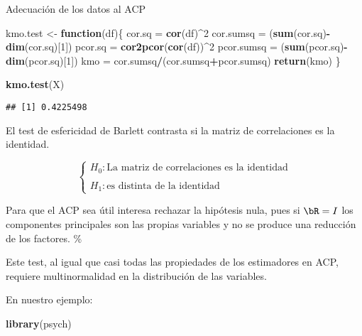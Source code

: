 \documentclass[
  spanish,
  ignorenonframetext,
]{beamer}
\newenvironment{Shaded}{\begin{snugshade}}{\end{snugshade}}
\newcommand{\ControlFlowTok}[1]{\textcolor[rgb]{0.13,0.29,0.53}{\textbf{#1}}}
\newcommand{\DecValTok}[1]{\textcolor[rgb]{0.00,0.00,0.81}{#1}}
\newcommand{\KeywordTok}[1]{\textcolor[rgb]{0.13,0.29,0.53}{\textbf{#1}}}
\newcommand{\NormalTok}[1]{#1}
\newcommand{\OperatorTok}[1]{\textcolor[rgb]{0.81,0.36,0.00}{\textbf{#1}}}
\newcommand{\StringTok}[1]{\textcolor[rgb]{0.31,0.60,0.02}{#1}}
\begin{document}
\begin{frame}[fragile]{Adecuación de los datos al ACP}
\begin{Shaded}
\begin{Highlighting}[]
\NormalTok{kmo.test \textless{}{-}}\StringTok{ }\ControlFlowTok{function}\NormalTok{(df)\{}
\NormalTok{cor.sq =}\StringTok{ }\KeywordTok{cor}\NormalTok{(df)}\OperatorTok{\^{}}\DecValTok{2}
\NormalTok{cor.sumsq =}\StringTok{ }\NormalTok{(}\KeywordTok{sum}\NormalTok{(cor.sq)}\OperatorTok{{-}}\KeywordTok{dim}\NormalTok{(cor.sq)[}\DecValTok{1}\NormalTok{])}
\NormalTok{pcor.sq =}\StringTok{ }\KeywordTok{cor2pcor}\NormalTok{(}\KeywordTok{cor}\NormalTok{(df))}\OperatorTok{\^{}}\DecValTok{2}
\NormalTok{pcor.sumsq =}\StringTok{ }\NormalTok{(}\KeywordTok{sum}\NormalTok{(pcor.sq)}\OperatorTok{{-}}\KeywordTok{dim}\NormalTok{(pcor.sq)[}\DecValTok{1}\NormalTok{])}
\NormalTok{kmo =}\StringTok{ }\NormalTok{cor.sumsq}\OperatorTok{/}\NormalTok{(cor.sumsq}\OperatorTok{+}\NormalTok{pcor.sumsq)}
\KeywordTok{return}\NormalTok{(kmo)}
\NormalTok{\} }

\KeywordTok{kmo.test}\NormalTok{(X)}
\end{Highlighting}
\end{Shaded}

\begin{verbatim}
## [1] 0.4225498
\end{verbatim}

El test de esfericidad de Barlett contrasta si la matriz de
correlaciones es la identidad.

\[\left\{ \begin{array}{l}
H_0: \mbox{La matriz de correlaciones es la identidad}\\\\ H_1: \mbox{es
distinta de la
identidad}\end{array}\right.\]

Para que el ACP sea útil interesa rechazar la hipótesis nula, pues si
\(\bR=I\) los componentes principales son las propias variables y no se
produce una reducción de los factores. \%

Este test, al igual que casi todas las propiedades de los estimadores en
ACP, requiere multinormalidad en la distribución de las variables.

En nuestro ejemplo:

\begin{Shaded}
\begin{Highlighting}[]
\KeywordTok{library}\NormalTok{(psych)}
\end{Highlighting}
\end{Shaded}


\end{frame}
\end{document}
